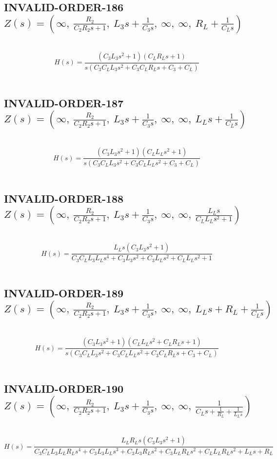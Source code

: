 \documentclass{article}
\begin{document}
\subsection{INVALID-ORDER-186 $Z(s) = \left( \infty, \  \frac{R_{2}}{C_{2} R_{2} s + 1}, \  L_{3} s + \frac{1}{C_{3} s}, \  \infty, \  \infty, \  R_{L} + \frac{1}{C_{L} s}\right)$ } \ 
\textbf{\[H(s) = \frac{\left(C_{3} L_{3} s^{2} + 1\right) \left(C_{L} R_{L} s + 1\right)}{s \left(C_{3} C_{L} L_{3} s^{2} + C_{3} C_{L} R_{L} s + C_{3} + C_{L}\right)}\] } \ 
\subsection{INVALID-ORDER-187 $Z(s) = \left( \infty, \  \frac{R_{2}}{C_{2} R_{2} s + 1}, \  L_{3} s + \frac{1}{C_{3} s}, \  \infty, \  \infty, \  L_{L} s + \frac{1}{C_{L} s}\right)$ } \ 
\textbf{\[H(s) = \frac{\left(C_{3} L_{3} s^{2} + 1\right) \left(C_{L} L_{L} s^{2} + 1\right)}{s \left(C_{3} C_{L} L_{3} s^{2} + C_{3} C_{L} L_{L} s^{2} + C_{3} + C_{L}\right)}\] } \ 
\subsection{INVALID-ORDER-188 $Z(s) = \left( \infty, \  \frac{R_{2}}{C_{2} R_{2} s + 1}, \  L_{3} s + \frac{1}{C_{3} s}, \  \infty, \  \infty, \  \frac{L_{L} s}{C_{L} L_{L} s^{2} + 1}\right)$ } \ 
\textbf{\[H(s) = \frac{L_{L} s \left(C_{3} L_{3} s^{2} + 1\right)}{C_{3} C_{L} L_{3} L_{L} s^{4} + C_{3} L_{3} s^{2} + C_{3} L_{L} s^{2} + C_{L} L_{L} s^{2} + 1}\] } \ 
\subsection{INVALID-ORDER-189 $Z(s) = \left( \infty, \  \frac{R_{2}}{C_{2} R_{2} s + 1}, \  L_{3} s + \frac{1}{C_{3} s}, \  \infty, \  \infty, \  L_{L} s + R_{L} + \frac{1}{C_{L} s}\right)$ } \ 
\textbf{\[H(s) = \frac{\left(C_{3} L_{3} s^{2} + 1\right) \left(C_{L} L_{L} s^{2} + C_{L} R_{L} s + 1\right)}{s \left(C_{3} C_{L} L_{3} s^{2} + C_{3} C_{L} L_{L} s^{2} + C_{3} C_{L} R_{L} s + C_{3} + C_{L}\right)}\] } \ 
\subsection{INVALID-ORDER-190 $Z(s) = \left( \infty, \  \frac{R_{2}}{C_{2} R_{2} s + 1}, \  L_{3} s + \frac{1}{C_{3} s}, \  \infty, \  \infty, \  \frac{1}{C_{L} s + \frac{1}{R_{L}} + \frac{1}{L_{L} s}}\right)$ } \ 
\textbf{\[H(s) = \frac{L_{L} R_{L} s \left(C_{3} L_{3} s^{2} + 1\right)}{C_{3} C_{L} L_{3} L_{L} R_{L} s^{4} + C_{3} L_{3} L_{L} s^{3} + C_{3} L_{3} R_{L} s^{2} + C_{3} L_{L} R_{L} s^{2} + C_{L} L_{L} R_{L} s^{2} + L_{L} s + R_{L}}\] } \ 
\end{document}
